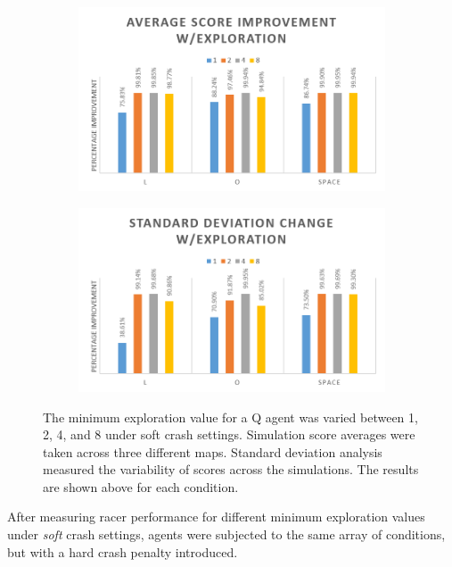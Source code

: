 \documentclass[12pt, letter]{article}
\begin{document}
\begin{figure}[h] 
    \centering
    \begin{subfigure}[b]{0.48\textwidth}
        \includegraphics[width=1\textwidth]{img/minE/AvgScore}
    \end{subfigure}
    \begin{subfigure}[b]{0.48\textwidth}
        \includegraphics[width=1\textwidth]{img/minE/StDev}
    \end{subfigure}
    \caption{The minimum exploration value for a Q agent was varied between 1, 2, 4, and 8 under soft crash settings.  Simulation score averages were taken across three different maps. Standard deviation analysis measured the variability of scores across the simulations. The results are shown above for each condition.}
    \label{fig:minEAvgScoreStDev}
\end{figure}
\clearpage

After measuring racer performance for different minimum exploration values under \emph{soft} crash settings, agents were subjected to the same array of conditions, but with a hard crash penalty introduced.
\end{document}
